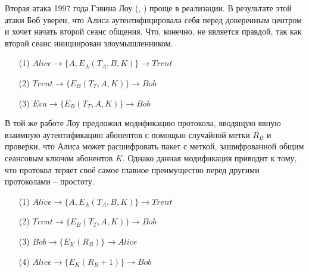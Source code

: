Вторая атака 1997 года Гэвина Лоу (, \cite{Lowe:1997}) проще в реализации. В результате этой атаки Боб уверен, что Алиса аутентифицировала себя перед доверенным центром и хочет начать второй сеанс общения. Что, конечно, не является правдой, так как второй сеанс инициирован злоумышленником.

\begin{samepage}\begin{itemize}
	\item[(1)] $Alice \to \{ A, E_A \left( T_A, B, K \right) \} \to Trent$
	\item[(2)] $Trent \to \{ E_B \left( T_T, A, K \right) \} \to Bob$
	\item[(3)] $Eva \to \{ E_B \left( T_T, A, K \right) \} \to Bob$
\end{itemize}\end{samepage}

В той же работе Лоу предложил модификацию протокола, вводящую явную взаимную аутентификацию абонентов с помощью случайной метки $R_B$ и проверки, что Алиса может расшифровать пакет с меткой, зашифрованной общим сеансовым ключом абонентов $K$. Однако данная модификация приводит к тому, что протокол теряет своё самое главное преимущество перед другими протоколами -- простоту.

\begin{samepage}\begin{itemize}
	\item[(1)] $Alice \to \{ A, E_A \left( T_A, B, K \right) \} \to Trent$
	\item[(2)] $Trent \to \{ E_B \left( T_T, A, K \right) \} \to Bob$
	\item[(3)] $Bob \to \{ E_K \left( R_B \right) \} \to Alice$
	\item[(4)] $Alice \to \{ E_K \left( R_B + 1 \right) \} \to Bob$
\end{itemize}\end{samepage}

